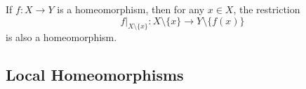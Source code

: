   \begin{theorem}
    If $f: X \rightarrow Y$ is a homeomorphism, then for any $x \in X$, the restriction 
    \begin{equation}
      f|_{X \setminus \{x\}} : X \setminus \{x\} \rightarrow Y \setminus \{f(x)\}
    \end{equation}
    is also a homeomorphism. 
  \end{theorem}

\subsection{Local Homeomorphisms} 



